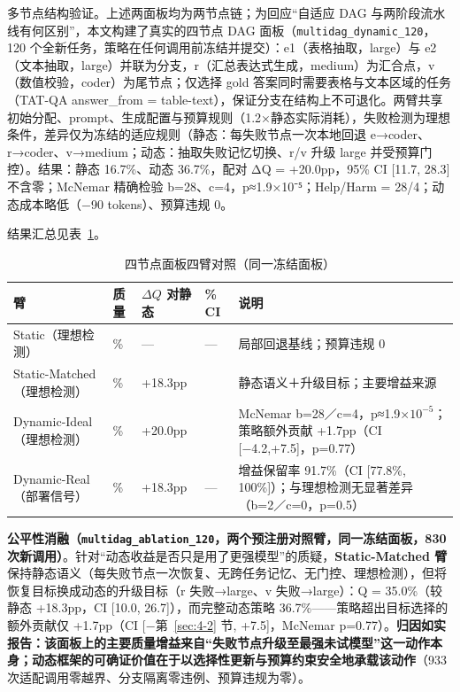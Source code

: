 多节点结构验证。上述两面板均为两节点链；为回应``自适应 DAG 与两阶段流水线有何区别''，本文构建了真实的四节点 DAG 面板（\texttt{multidag\_dynamic\_120}，120 个全新任务，策略在任何调用前冻结并提交）：e1（表格抽取，large）与 e2（文本抽取，large）并联为分支，r（汇总表达式生成，medium）为汇合点，v（数值校验，coder）为尾节点；仅选择 gold 答案同时需要表格与文本区域的任务（TAT-QA answer\_from = table-text），保证分支在结构上不可退化。两臂共享初始分配、prompt、生成配置与预算规则（1.2×静态实际消耗），失败检测为理想条件，差异仅为冻结的适应规则（静态：每失败节点一次本地回退 e→coder、r→coder、v→medium；动态：抽取失败记忆切换、r/v 升级 large 并受预算门控）。结果：静态 16.7\%、动态 36.7\%，配对 ΔQ = +20.0pp，95\% CI {[}11.7, 28.3{]} 不含零；McNemar 精确检验 b=28、c=4，p≈1.9×10⁻⁵；Help/Harm = 28/4；动态成本略低（−90 tokens）、预算违规 0。

结果汇总见表~\ref{tab:exp4-13}。

\begin{table}[htbp]
\centering\small
\caption{四节点面板四臂对照（同一冻结面板）}
\label{tab:exp4-13}
\begin{tabular}{@{}>{\raggedright\arraybackslash}p{}>{\raggedright\arraybackslash}p{}>{\raggedright\arraybackslash}p{}>{\raggedright\arraybackslash}p{}>{\raggedright\arraybackslash}p{}@{}}
\toprule
臂 & 质量 & $\Delta Q$ 对静态 & 95\% CI & 说明 \\
\midrule
Static（理想检测） & 16.7\% & — & — & 局部回退基线；预算违规 0 \\
Static-Matched（理想检测） & 35.0\% & +18.3pp & [10.0, 26.7] & 静态语义＋升级目标；主要增益来源 \\
Dynamic-Ideal（理想检测） & 36.7\% & +20.0pp & [11.7, 28.3] & McNemar b=28／c=4，p≈1.9$\times 10^{-5}$；策略额外贡献 +1.7pp（CI [−4.2,+7.5]，p=0.77） \\
Dynamic-Real（部署信号） & 35.0\% & +18.3pp & — & 增益保留率 91.7\%（CI [77.8\%, 100\%]）；与理想检测无显著差异（b=2／c=0，p=0.5） \\
\bottomrule
\end{tabular}
\end{table}

\textbf{公平性消融（\texttt{multidag\_ablation\_120}，两个预注册对照臂，同一冻结面板，830 次新调用）}。针对``动态收益是否只是用了更强模型''的质疑，\textbf{Static-Matched 臂}保持静态语义（每失败节点一次恢复、无跨任务记忆、无门控、理想检测），但将恢复目标换成动态的升级目标（r 失败→large、v 失败→large）：Q = 35.0\%（较静态 +18.3pp，CI {[}10.0, 26.7{]}），而完整动态策略 36.7\%------策略超出目标选择的额外贡献仅 +1.7pp（CI {[}−第~\ref{sec:4-2} 节, +7.5{]}，McNemar p=0.77）。\textbf{归因如实报告：该面板上的主要质量增益来自``失败节点升级至最强未试模型''这一动作本身；动态框架的可确证价值在于以选择性更新与预算约束安全地承载该动作}（933 次适配调用零越界、分支隔离零违例、预算违规为零）。

